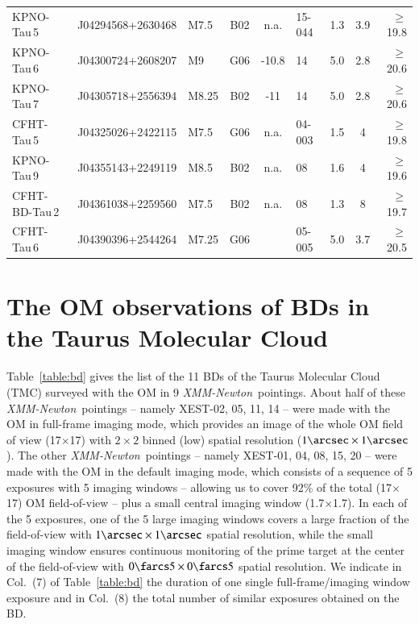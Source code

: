 \documentclass{aa}
\newcommand{\xmm}{{\it XMM-Newton}}
\begin{document}
\begin{table}[!ht]
\begin{tabular}{lclcclccr}
KPNO-Tau\,5   & J04294568+2630468   & M7.5  & B02  & n.a.     & 15-044 & 1.3 & 3.9 & $\ge$19.8 \\ 
KPNO-Tau\,6   & J04300724+2608207   & M9    & G06  & -10.8    & 14     & 5.0 & 2.8 & $\ge$20.6 \\ 
KPNO-Tau\,7   & J04305718+2556394   & M8.25 & B02  & -11      & 14     & 5.0 & 2.8 & $\ge$20.6 \\ 
CFHT-Tau\,5   & J04325026+2422115   & M7.5  & G06  & n.a.     & 04-003 & 1.5 & 4   & $\ge$19.8 \\ 
KPNO-Tau\,9   & J04355143+2249119   & M8.5  & B02  & n.a.     & 08     & 1.6 & 4   & $\ge$19.6 \\ 
CFHT-BD-Tau\,2& J04361038+2259560   & M7.5  & B02  & n.a.     & 08     & 1.3 & 8   & $\ge$19.7 \\ 
CFHT-Tau\,6   & J04390396+2544264   & M7.25 & G06  & \dotfill & 05-005 & 5.0 & 3.7 & $\ge$20.5 \\ 
\hline
\end{tabular}
\end{table}
 
 
\section{The OM observations of BDs in the Taurus Molecular Cloud}
\label{aperture}

Table~\ref{table:bd} gives the list of the 11 BDs of the Taurus
  Molecular Cloud (TMC) surveyed with the OM in
9 \xmm~pointings. About half of these \xmm~pointings -- namely
XEST-02, 05, 11, 14 -- were made with the OM in full-frame
imaging mode, which provides an image of the whole OM field of view
(17\arcmin$\times$17\arcmin) with $2\times2$ binned (low) spatial
resolution ($1\arcsec\times1\arcsec$). The other \xmm~pointings --
namely XEST-01, 04, 08, 15, 20 -- were made with the OM in
the default imaging mode, which consists of a sequence of 5 exposures
with 5 imaging windows -- allowing us to cover 92\% of the total
(17\arcmin$\times$17\arcmin) OM field-of-view -- plus a small central
imaging window (1.7\arcmin$\times$1.7\arcmin). In each of the 5
exposures, one of the 5 large imaging windows covers a large fraction
of the field-of-view with $1\arcsec\times1\arcsec$ spatial resolution,
while the small imaging window ensures continuous monitoring of the
prime target at the center of the field-of-view with
$0\farcs5\times0\farcs5$ spatial resolution. We indicate in Col.~(7)
of Table~\ref{table:bd} the duration of one single full-frame/imaging window
exposure and in Col.~(8) the total number of similar exposures obtained on the BD.
\end{document}
